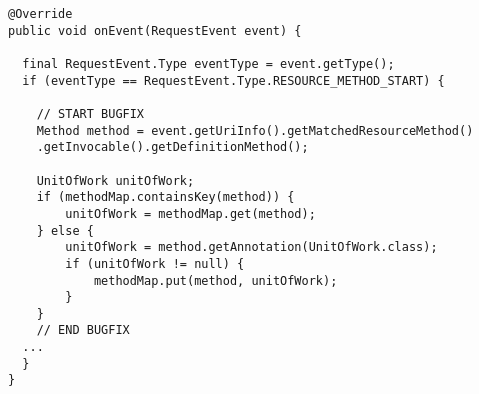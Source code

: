 \documentclass[11pt]{article}
\begin{document}
\begin{verbatim}
@Override
public void onEvent(RequestEvent event) {

  final RequestEvent.Type eventType = event.getType();
  if (eventType == RequestEvent.Type.RESOURCE_METHOD_START) {

    // START BUGFIX
    Method method = event.getUriInfo().getMatchedResourceMethod()
    .getInvocable().getDefinitionMethod();

    UnitOfWork unitOfWork;
    if (methodMap.containsKey(method)) {
        unitOfWork = methodMap.get(method);
    } else {
        unitOfWork = method.getAnnotation(UnitOfWork.class);
        if (unitOfWork != null) {
            methodMap.put(method, unitOfWork);
        }
    }
    // END BUGFIX
  ...
  }
}
\end{verbatim}
\end{document}
